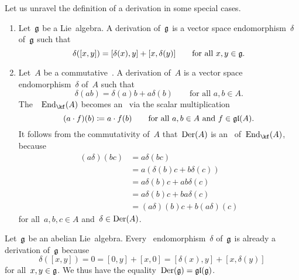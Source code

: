 \begin{remark}
	\label{derivations made explicit}
	Let us unravel the definition of a derivation in some special cases.
	\begin{enumerate}
		\item
			Let~$\mathfrak{g}$ be a Lie~algebra.
			A derivation of~$\mathfrak{g}$ is a vector space endomorphism~$\delta$ of~$\mathfrak{g}$ such that
			\[
				\delta([x,y])
				=
				[\delta(x), y] + [x, \delta(y)]
				\qquad
				\text{for all~$x, y \in \mathfrak{g}$.}
			\]
		\item
			Let~$A$ be a commutative~\algebra{$\kf$}.
			A derivation of~$A$ is a vector space endomorphism~$\delta$ of~$A$ such that
			\[
				\delta(ab)
				=
				\delta(a) b + a \delta(b)
				\qquad
				\text{for all~$a, b \in A$}.
			\]
			The~\vectorspace{$\kf$}~$\End_{\kf}(A)$ becomes an~ via the scalar multiplication
			\[
				(a \cdot f)(b)
				\coloneqq
				a \cdot f(b)
				\qquad
				\text{for all~$a, b \in A$ and~$f \in \mathfrak{gl}(A)$.}
			\]
			It follows from the commutativity of~$A$ that~$\operatorname{Der}(A)$ is an~ of~$\End_{\kf}(A)$, because
			\begin{align*}
				(a \delta)(b c)
				&=
				a \delta(b c)
				\\
				&=
				a ( \delta(b) c + b \delta(c) )
				\\
				&=
				a \delta(b) c + a b \delta(c)
				\\
				&=
				a \delta(b) c + b a \delta(c)
				\\
				&=
				(a \delta)(b) c + b (a \delta)(c)
			\end{align*}
			for all~$a, b, c \in A$ and~$\delta \in \operatorname{Der}(A)$.
	\end{enumerate}
\end{remark}


\begin{example}
	\label{derivations of abelian lie algebra}
	Let~$\mathfrak{g}$ be an abelian Lie~algebra.
	Every~\linear{$\kf$} endomorphism~$\delta$ of~$\mathfrak{g}$ is already a derivation of~$\mathfrak{g}$ because
	\[
		\delta([x,y])
		=
		0
		=
		[0, y] + [x, 0]
		=
		[\delta(x), y] + [x, \delta(y)]
	\]
	for all~$x, y \in \mathfrak{g}$.
	We thus have the equality~$\operatorname{Der}(\mathfrak{g}) = \mathfrak{gl}(\mathfrak{g})$.
\end{example}


